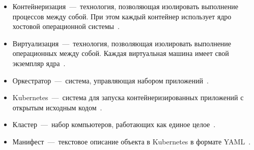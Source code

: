 \begin{definitions}
\begin{itemize}
	\item Контейнеризация~---~технология, позволяющая изолировать выполнение процессов между собой. При этом каждый контейнер использует ядро хостовой операционной системы~\cite{luksa2017kubernetes}.
	\item Виртуализация~---~технология, позволяющая изолировать выполнение операционных между собой. Каждая виртуальная машина имеет свой экземпляр ядра~\cite{luksa2017kubernetes}.
	\item Оркестратор~---~система, управляющая набором приложений~\cite{сизов2024организация}.
	\item Kubernetes~---~система для запуска контейнеризированных приложений с открытым исходным кодом~\cite{kubernetes}.
	\item Кластер~---~набор компьютеров, работающих как единое целое~\cite{luksa2017kubernetes}.
	\item Манифест~---~текстовое описание объекта в Kubernetes в формате YAML~\cite{kubernetesresources}.
\end{itemize}
\end{definitions}
